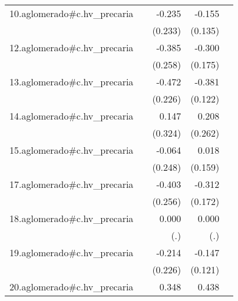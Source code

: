 {\begin{longtable}{l*{4}{D{.}{.}{-1}}}
\addlinespace
10.aglomerado#c.hv\_precaria&                     &      -0.235         &      -0.155         &                     \\
            &                     &     (0.233)         &     (0.135)         &                     \\
\addlinespace
12.aglomerado#c.hv\_precaria&                     &      -0.385         &      -0.300         &                     \\
            &                     &     (0.258)         &     (0.175)         &                     \\
\addlinespace
13.aglomerado#c.hv\_precaria&                     &      -0.472\sym{*}  &      -0.381\sym{**} &                     \\
            &                     &     (0.226)         &     (0.122)         &                     \\
\addlinespace
14.aglomerado#c.hv\_precaria&                     &       0.147         &       0.208         &                     \\
            &                     &     (0.324)         &     (0.262)         &                     \\
\addlinespace
15.aglomerado#c.hv\_precaria&                     &      -0.064         &       0.018         &                     \\
            &                     &     (0.248)         &     (0.159)         &                     \\
\addlinespace
17.aglomerado#c.hv\_precaria&                     &      -0.403         &      -0.312         &                     \\
            &                     &     (0.256)         &     (0.172)         &                     \\
\addlinespace
18.aglomerado#c.hv\_precaria&                     &       0.000         &       0.000         &                     \\
            &                     &         (.)         &         (.)         &                     \\
\addlinespace
19.aglomerado#c.hv\_precaria&                     &      -0.214         &      -0.147         &                     \\
            &                     &     (0.226)         &     (0.121)         &                     \\
\addlinespace
20.aglomerado#c.hv\_precaria&                     &       0.348         &       0.438         &                     \\

\end{longtable}}

